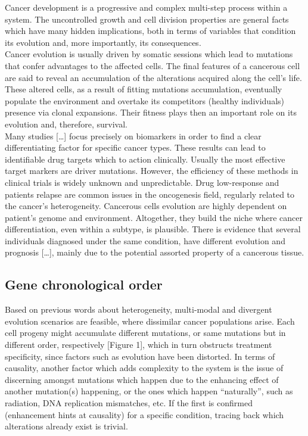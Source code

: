 Cancer development is a progressive and complex multi-step process within a system. The uncontrolled growth and cell division properties are general facts which have many hidden implications, both in terms of variables that condition its evolution and, more importantly, its consequences.
\\

Cancer evolution is usually driven by somatic sessions which lead to mutations that confer advantages to the affected cells. The final features of a cancerous cell are said to reveal an accumulation of the alterations acquired along the cell’s life.
\\

These altered cells, as a result of fitting mutations accumulation, eventually populate the environment and overtake its competitors (healthy individuals) presence via clonal expansions. Their fitness plays then an important role on its evolution and, therefore, survival.
\\

Many studies […] focus precisely on biomarkers in order to find a clear differentiating factor for specific cancer types. These results can lead to identifiable drug targets which to action clinically. Usually the most effective target markers are driver mutations. However, the efficiency of these methods in clinical trials is widely unknown and unpredictable. Drug low-response and patients relapse are common issues in the oncogenesis field, regularly related to the cancer’s heterogeneity. Cancerous cells evolution are highly dependent on patient’s genome and environment. Altogether, they build the niche where cancer differentiation, even within a subtype, is plausible. There is evidence that several individuals diagnosed under the same condition, have different evolution and prognosis […], mainly due to the potential assorted property of a cancerous tissue.
\\

\subsection{Gene chronological order}
Based on previous words about heterogeneity, multi-modal and divergent evolution scenarios are feasible, where dissimilar cancer populations arise. Each cell progeny might accumulate different mutations, or same mutations but in different order, respectively [Figure 1], which in turn obstructs treatment specificity, since factors such as evolution have been distorted.
In terms of causality, another factor which adds complexity to the system is the issue of discerning amongst mutations which happen due to the enhancing effect of another mutation(s) happening, or the ones which happen “naturally”, such as radiation, DNA replication mismatches, etc. If the first is confirmed (enhancement hints at causality) for a specific condition, tracing back which alterations already exist is trivial.
\\

